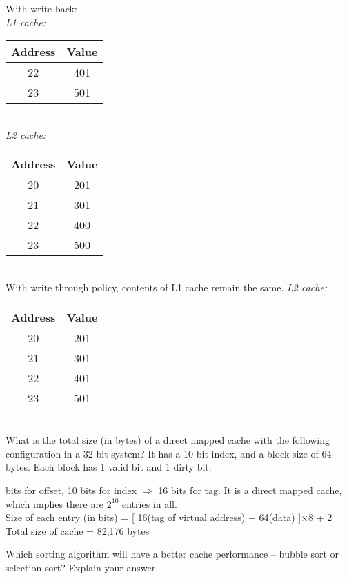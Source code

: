 \begin{ExerciseList}
\Answer With write back:\\
{\em L1 cache:}\\
\begin{tabular}{|c|c|}
\hline
{\bf Address} & {\bf Value}\\
\hline \hline
22 & 401 \\
\hline
23 & 501 \\
\hline
\end{tabular}\\

{\em L2 cache:}\\
\begin{tabular}{|c|c|}
\hline
{\bf Address} & {\bf Value}\\
\hline \hline
20 & 201 \\
\hline
21 & 301 \\
\hline
22 & 400 \\
\hline
23 & 500 \\
\hline
\end{tabular}\\

With write through policy, contents of L1 cache remain the same. {\em L2 cache:}\\

\begin{tabular}{|c|c|}
\hline
{\bf Address} & {\bf Value}\\
\hline \hline
20 & 201 \\
\hline
21 & 301 \\
\hline
22 & 401 \\
\hline
23 & 501 \\
\hline
\end{tabular}\\




\Exercise
What is the total size (in bytes) of a direct mapped cache with the following configuration in a 32
bit system?
It has a 10 bit index, and a block size of 64 bytes. Each block has 1 valid bit and 1
dirty bit. 

 bits for offset, 10 bits for index $\Rightarrow$ 16 bits for tag. It is a direct mapped cache, which implies
there are $2^{10}$ entries in all.\\Size of each entry (in bits) = [ 16(tag of virtual address) + 64(data) ]$\times 8$ +
2 \\ Total size of cache = 82,176 bytes


\Exercise
Which sorting algorithm will have a better cache performance -- bubble sort or selection sort? Explain your
answer.


\end{ExerciseList}
